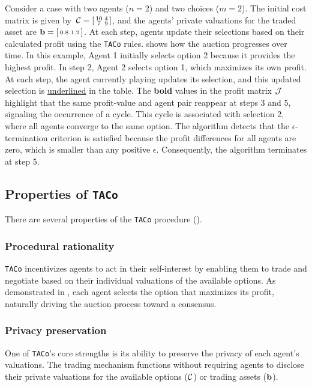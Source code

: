 \begin{example} \label{example:2}
    Consider a case with two agents ($n=2$) and two choices ($m=2$). The initial cost matrix is given by $\,\mathcal{C}=\begin{bsmallmatrix} 10 & 4 \\ 7 & 9 \end{bsmallmatrix}$, and the agents' private valuations for the traded asset are $\mathbf{b}=\begin{bsmallmatrix} 0.8 & 1.2 \end{bsmallmatrix}$.
    At each step, agents update their selections based on their calculated profit using the \texttt{TACo} rules.  shows how the auction progresses over time.
    In this example, Agent 1 initially selects option 2 because it provides the highest profit. In step 2, Agent 2 selects option 1, which maximizes its own profit. At each step, the agent currently playing updates its selection, and this updated selection is \underline{underlined} in the table. The \textbf{bold} values in the profit matrix $\mathcal{J}$ highlight that the same profit-value and agent pair reappear at steps 3 and 5, signaling the occurrence of a cycle. This cycle is associated with selection 2, where all agents converge to the same option. The algorithm detects that the $\epsilon$-termination criterion is satisfied because the profit differences for all agents are zero, which is smaller than any positive $\epsilon$. Consequently, the algorithm terminates at step 5. 
\end{example}

\subsection{Properties of \texttt{TACo}}
There are several properties of the \texttt{TACo} procedure ().
\subsubsection{Procedural rationality}
\texttt{TACo} incentivizes agents to act in their self-interest by enabling them to trade and negotiate based on their individual valuations of the available options. As demonstrated in , each agent selects the option that maximizes its profit, naturally driving the auction process toward a consensus.

\subsubsection{Privacy preservation}
One of \texttt{TACo}’s core strengths is its ability to preserve the privacy of each agent’s valuations. The trading mechanism functions without requiring agents to disclose their private valuations for the available options ($\mathcal{C}$) or trading assets ($\mathbf{b}$).

